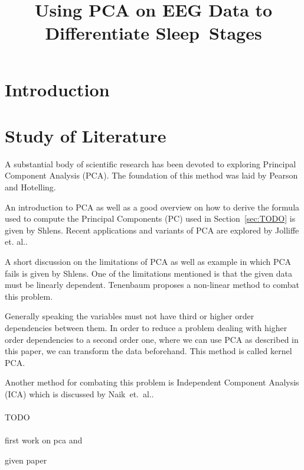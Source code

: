 \documentclass[a4paper]{IEEEtran}
\title{Using PCA on EEG Data to Differentiate Sleep~Stages}
\author{\IEEEauthorblockN{Ida Hönigmann}
	\IEEEauthorblockA{\\Technical University Vienna, Austria\\
		Email: e12002348@student.tuwien.ac.at}}
\begin{document}
\maketitle

\begin{abstract}

\end{abstract}

\section{Introduction}

\section{Study of Literature}
\label{sec:study_of_literature}
A substantial body of scientific research has been devoted to exploring Principal Component Analysis (PCA).
The foundation of this method was laid by Pearson\cite{Pearson1901} and Hotelling\cite{Hotelling1933}.

An introduction to PCA as well as a good overview on how to derive the formula used to compute the Principal Components (PC) used in Section~\ref{sec:TODO} is given by Shlens\cite{Shlens2014}.
Recent applications and variants of PCA are explored by Jolliffe et. al.\cite{Jolliffe2016}.

A short discussion on the limitations of PCA as well as example in which PCA fails is given by Shlens\cite{Shlens2014}.
One of the limitations mentioned is that the given data must be linearly dependent.
Tenenbaum proposes a non-linear method to combat this problem\cite{Tenenbaum2000}.

Generally speaking the variables must not have third or higher order dependencies between them. In order to reduce a problem dealing with higher order dependencies to a second order one, where we can use PCA as described in this paper, we can transform the data beforehand. This method is called kernel PCA\cite{Shlens2014}.

Another method for combating this problem is Independent Component Analysis (ICA) which is discussed by Naik~et.~al.\cite{Naik2011}.
\\
\\
TODO
\\
\\
first work on pca \cite{Pearson1901} and \cite{Hotelling1933}

given paper \cite{Jolliffe2016}
\end{document}
